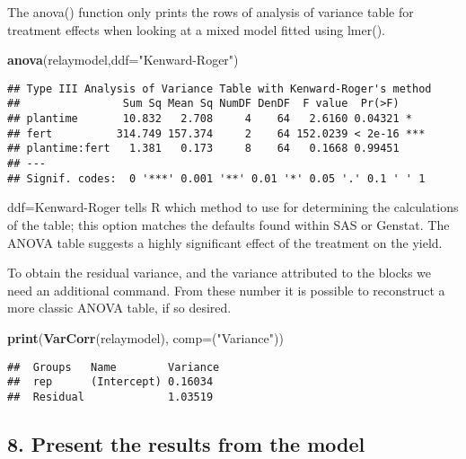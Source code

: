 \documentclass[]{book}
\newenvironment{Shaded}{\begin{snugshade}}{\end{snugshade}}
\newcommand{\KeywordTok}[1]{\textcolor[rgb]{0.13,0.29,0.53}{\textbf{#1}}}
\newcommand{\DataTypeTok}[1]{\textcolor[rgb]{0.13,0.29,0.53}{#1}}
\newcommand{\StringTok}[1]{\textcolor[rgb]{0.31,0.60,0.02}{#1}}
\newcommand{\NormalTok}[1]{#1}
\theoremstyle{definition}
\theoremstyle{definition}
\theoremstyle{definition}
\theoremstyle{remark}
\begin{document}
The anova() function only prints the rows of analysis of variance table
for treatment effects when looking at a mixed model fitted using lmer().

\begin{Shaded}
\begin{Highlighting}[]
\KeywordTok{anova}\NormalTok{(relaymodel,}\DataTypeTok{ddf=}\StringTok{"Kenward-Roger"}\NormalTok{)}
\end{Highlighting}
\end{Shaded}

\begin{verbatim}
## Type III Analysis of Variance Table with Kenward-Roger's method
##                Sum Sq Mean Sq NumDF DenDF  F value  Pr(>F)    
## plantime       10.832   2.708     4    64   2.6160 0.04321 *  
## fert          314.749 157.374     2    64 152.0239 < 2e-16 ***
## plantime:fert   1.381   0.173     8    64   0.1668 0.99451    
## ---
## Signif. codes:  0 '***' 0.001 '**' 0.01 '*' 0.05 '.' 0.1 ' ' 1
\end{verbatim}

ddf=Kenward-Roger tells R which method to use for determining the
calculations of the table; this option matches the defaults found within
SAS or Genstat. The ANOVA table suggests a highly significant effect of
the treatment on the yield.

To obtain the residual variance, and the variance attributed to the
blocks we need an additional command. From these number it is possible
to reconstruct a more classic ANOVA table, if so desired.

\begin{Shaded}
\begin{Highlighting}[]
\KeywordTok{print}\NormalTok{(}\KeywordTok{VarCorr}\NormalTok{(relaymodel), }\DataTypeTok{comp=}\NormalTok{(}\StringTok{"Variance"}\NormalTok{))}
\end{Highlighting}
\end{Shaded}

\begin{verbatim}
##  Groups   Name        Variance
##  rep      (Intercept) 0.16034 
##  Residual             1.03519
\end{verbatim}

\subsection{8. Present the results from the
model}\label{present-the-results-from-the-model-3}
\end{document}
